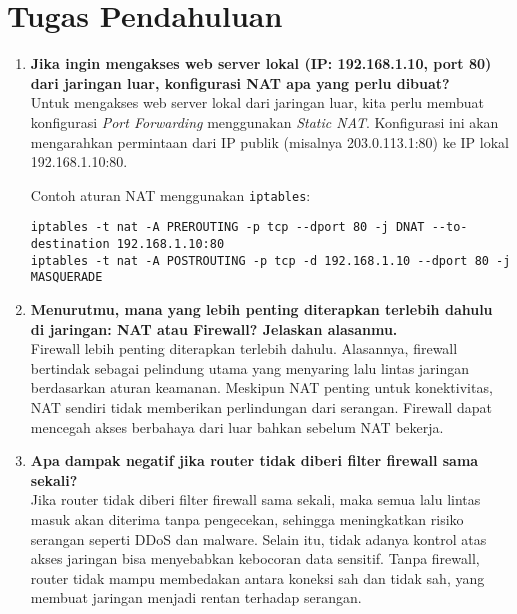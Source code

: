 \section{Tugas Pendahuluan}
\begin{enumerate}
    \item \textbf{Jika ingin mengakses web server lokal (IP: 192.168.1.10, port 80) dari jaringan luar, konfigurasi NAT apa yang perlu dibuat?}\\
    Untuk mengakses web server lokal dari jaringan luar, kita perlu membuat konfigurasi \textit{Port Forwarding} menggunakan \textit{Static NAT}. Konfigurasi ini akan mengarahkan permintaan dari IP publik (misalnya 203.0.113.1:80) ke IP lokal 192.168.1.10:80.

    Contoh aturan NAT menggunakan \texttt{iptables}:
    \begin{verbatim}
iptables -t nat -A PREROUTING -p tcp --dport 80 -j DNAT --to-destination 192.168.1.10:80
iptables -t nat -A POSTROUTING -p tcp -d 192.168.1.10 --dport 80 -j MASQUERADE
    \end{verbatim}

    \item \textbf{Menurutmu, mana yang lebih penting diterapkan terlebih dahulu di jaringan: NAT atau Firewall? Jelaskan alasanmu.}\\
    Firewall lebih penting diterapkan terlebih dahulu. Alasannya, firewall bertindak sebagai pelindung utama yang menyaring lalu lintas jaringan berdasarkan aturan keamanan. Meskipun NAT penting untuk konektivitas, NAT sendiri tidak memberikan perlindungan dari serangan. Firewall dapat mencegah akses berbahaya dari luar bahkan sebelum NAT bekerja.

    \item \textbf{Apa dampak negatif jika router tidak diberi filter firewall sama sekali?}\\
    Jika router tidak diberi filter firewall sama sekali, maka semua lalu lintas masuk akan diterima tanpa pengecekan, sehingga meningkatkan risiko serangan seperti DDoS dan malware. Selain itu, tidak adanya kontrol atas akses jaringan bisa menyebabkan kebocoran data sensitif. Tanpa firewall, router tidak mampu membedakan antara koneksi sah dan tidak sah, yang membuat jaringan menjadi rentan terhadap serangan.
\end{enumerate}